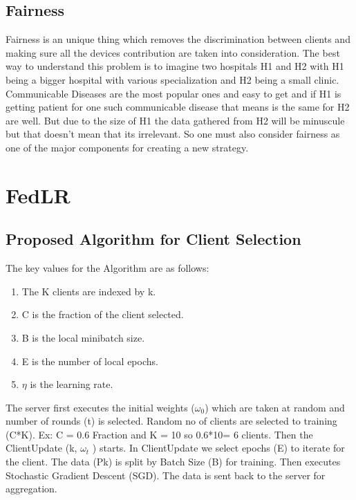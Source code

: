\documentclass[conference]{IEEEtran}
\begin{document}
\subsection{Fairness}
Fairness is an unique thing which removes the discrimination between clients and making sure all the devices contribution are taken into consideration. The best way to understand this problem is to imagine two hospitals H1 and H2 with H1 being a bigger hospital with various specialization and H2 being a small clinic. Communicable Diseases are the most popular ones and easy to get and if H1 is getting patient for one such communicable disease that means is the same for H2 are well. But due to the size of H1 the data gathered from H2 will be minuscule but that doesn't mean that its irrelevant. So one must also consider fairness as one of the major components for creating a new strategy. 
 
\section{FedLR}
 \subsection{Proposed Algorithm for Client Selection}
 The key values for the Algorithm are as follows:
 \begin{enumerate}
 	\item The K clients are indexed by k.
 	\item C is the fraction of the client selected.
 	\item B is the local minibatch size.
 	\item E is the number of local epochs.
 	\item $\eta$ is the learning rate.
 \end{enumerate}
 
 The server first executes the initial weights ($\omega_0$) which are taken at random and number of rounds (t) is selected.
 Random no of clients are selected to training (C*K). Ex: C = 0.6 Fraction and K = 10 so 0.6*10= 6 clients.
 Then the ClientUpdate (k, $\omega_t$ ) starts.
 In ClientUpdate we select epochs (E) to iterate for the client.
 The data (Pk) is split by Batch Size (B) for training.
 Then executes Stochastic Gradient Descent (SGD).
 The data is sent back to the server for aggregation. 
 
\end{document}
